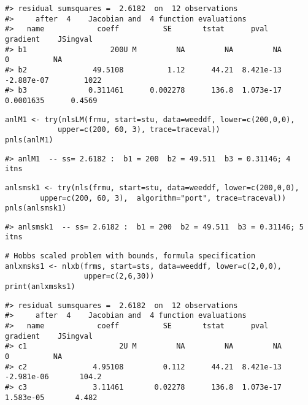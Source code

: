 \begin{verbatim}
#> residual sumsquares =  2.6182  on  12 observations
#>     after  4    Jacobian and  4 function evaluations
#>   name            coeff          SE       tstat      pval      gradient    JSingval   
#> b1                   200U M         NA         NA         NA           0          NA  
#> b2               49.5108          1.12      44.21  8.421e-13  -2.887e-07        1022  
#> b3              0.311461      0.002278      136.8  1.073e-17   0.0001635      0.4569
\end{verbatim}

\begin{verbatim}
anlM1 <- try(nlsLM(frmu, start=stu, data=weeddf, lower=c(200,0,0), 
            upper=c(200, 60, 3), trace=traceval))
pnls(anlM1)
\end{verbatim}

\begin{verbatim}
#> anlM1  -- ss= 2.6182 :  b1 = 200  b2 = 49.511  b3 = 0.31146; 4  itns
\end{verbatim}

\begin{verbatim}
anlsmsk1 <- try(nls(frmu, start=stu, data=weeddf, lower=c(200,0,0), 
        upper=c(200, 60, 3),  algorithm="port", trace=traceval))
pnls(anlsmsk1)
\end{verbatim}

\begin{verbatim}
#> anlsmsk1  -- ss= 2.6182 :  b1 = 200  b2 = 49.511  b3 = 0.31146; 5  itns
\end{verbatim}

\begin{verbatim}
# Hobbs scaled problem with bounds, formula specification
anlxmsks1 <- nlxb(frms, start=sts, data=weeddf, lower=c(2,0,0),
                  upper=c(2,6,30))
print(anlxmsks1)
\end{verbatim}

\begin{verbatim}
#> residual sumsquares =  2.6182  on  12 observations
#>     after  4    Jacobian and  4 function evaluations
#>   name            coeff          SE       tstat      pval      gradient    JSingval   
#> c1                     2U M         NA         NA         NA           0          NA  
#> c2               4.95108         0.112      44.21  8.421e-13  -2.981e-06       104.2  
#> c3               3.11461       0.02278      136.8  1.073e-17   1.583e-05       4.482
\end{verbatim}

